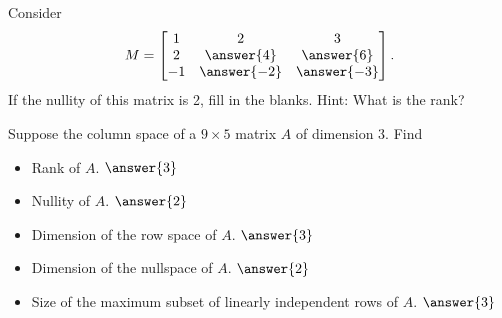 \documentclass{ximera}
\begin{document}
\begin{exercise}
    Consider
    \begin{equation*}
        M =
        \begin{bmatrix}
            1 & 2 & 3 \\
            2 & \answer{4} & \answer{6} \\
            -1 & \answer{-2} & \answer{-3}
        \end{bmatrix} .
    \end{equation*}
    If the nullity of this matrix is 2, fill in the blanks.  Hint: What is the rank?
\end{exercise}

\begin{exercise}%
    Suppose the column space of a $9 \times 5$ matrix $A$ of dimension 3.  Find
    \begin{itemize}
        \item Rank of $A$. $\answer{3}$
        \item Nullity of $A$. $\answer{2}$
        \item Dimension of the row space of $A$. $\answer{3}$
        \item Dimension of the nullspace of $A$. $\answer{2}$
        \item Size of the maximum subset of linearly independent rows of $A$. $\answer{3}$
    \end{itemize}
\end{exercise}
\end{document}
